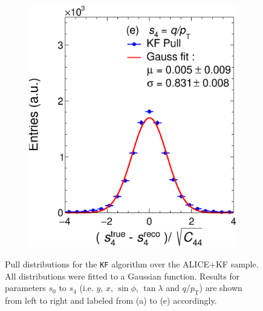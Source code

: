 \begin{figure}[t]
\begin{subfigure}{0.32\textwidth}
         \includegraphics[width=\textwidth]{figures/ch4-KF_NDGArLite/MC/ALICE+KF/UnitKFEnd_p4.eps}
         \caption{}
         \label{fig:resp4KF_GArLite_ALICE+KF}
     \end{subfigure}
        \caption{Pull distributions for the \texttt{KF} algorithm over the ALICE+KF sample. All distributions were fitted to a Gaussian function. Results for parameters $s_0$ to $s_4$ (i.e. $y$, $x$, $\sin\phi$, $\tan\lambda$ and $q/p_{\text{T}}$) are shown from left to right and labeled from (a) to (e) accordingly. }
        \label{fig:MCUnitKFEnd_GArLite_ALICE+KF}
\end{figure}

